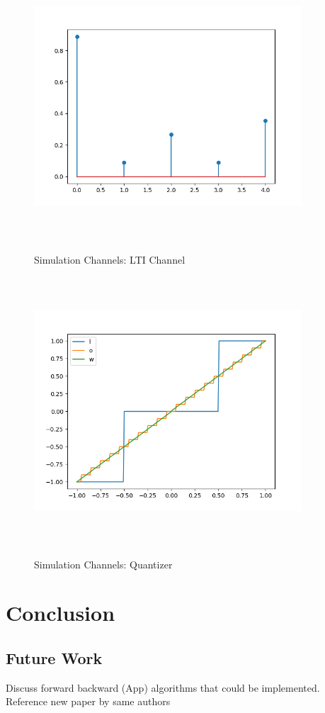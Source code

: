 \documentclass[12pt,a4paper]{article}
\begin{document}
\begin{figure}[H]
\centering
	  \caption{Simulation Channels: LTI Channel}
	\includegraphics[width=10cm,height = 10cm]{system_model/lti_channel}
	  \label{fig:LTI Channel}
\end{figure}
\begin{figure}[H]
	  \caption{Simulation Channels: Quantizer}
	\includegraphics[width=10cm,height = 10cm]{system_model/quantizer}
	  \label{fig:Quantized Channel}
\end{figure}

\section{Conclusion}
\subsection{Future Work}
Discuss forward backward (App) algorithms that could be implemented. Reference new paper by same authors

\newpage
{}
\end{document}
